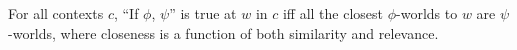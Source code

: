 For all contexts $c$, \enquote{If $\phi$, $\psi$} is true at $w$ in $c$ iff all the closest $\phi$-worlds to $w$ are $\psi$-worlds, where closeness is a function of both similarity and relevance.\\\emptyfill\citep[p. 20]{Lewis2018}